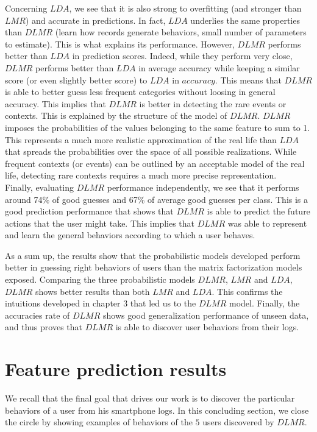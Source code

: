 Concerning $LDA$, we see that it is also strong to overfitting (and stronger than $LMR$) and accurate in predictions. In fact, $LDA$ underlies the same properties than $DLMR$ (learn how records generate behaviors, small number of parameters to estimate). This is what explains its performance. However, $DLMR$ performs better than $LDA$ in prediction scores. Indeed, while they perform very close, $DLMR$ performs better than $LDA$ in average accuracy while keeping a similar score (or even slightly better score) to $LDA$ in $accuracy$. This means that $DLMR$ is able to better guess less frequent categories without loosing in general accuracy. This implies that $DLMR$ is better in detecting the rare events or contexts. This is explained by the structure of the model of $DLMR$. $DLMR$ imposes the probabilities of the values belonging to the same feature to sum to 1. This represents a much more realistic approximation of the real life than $LDA$ that spreads the probabilities over the space of all possible realizations. While frequent contexts (or events) can be outlined by an acceptable model of the real life, detecting rare contexts requires a much more precise representation.
\\Finally, evaluating $DLMR$ performance independently, we see that it performs around 74\% of good guesses and 67\% of average good guesses per class. This is a good prediction performance that shows that $DLMR$ is able to predict the future actions that the user might take. This implies that $DLMR$ was able to represent and learn the general behaviors according to which a user behaves.

As a sum up, the results show that the probabilistic models developed perform better in guessing right behaviors of users than the matrix factorization models exposed. Comparing the three probabilistic models $DLMR$, $LMR$ and $LDA$, $DLMR$ shows better results than both $LMR$ and $LDA$. This confirms the intuitions developed in chapter 3 that led us to the $DLMR$ model. Finally, the accuracies rate of $DLMR$ shows good generalization performance of unseen data, and thus proves that $DLMR$ is able to discover user behaviors from their logs.



\section{Feature prediction results}
We recall that the final goal that drives our work is to discover the particular behaviors of a user from his smartphone logs. In this concluding section, we close the circle by showing examples of behaviors of the $5$ users discovered by $DLMR$. \par

